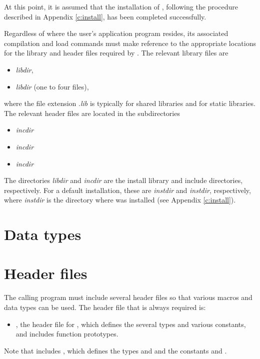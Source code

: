 At this point, it is assumed that the installation of {\ida},
following the procedure described in Appendix \ref{c:install}, has
been completed successfully.

Regardless of where the user's application program resides, its
associated compilation and load commands must make reference to the
appropriate locations for the library and header files required by
{\ida}.  The relevant library files are
\begin{itemize}
\item {\em libdir},
\item {\em libdir} (one to four files),
\end{itemize}
where the file extension .{\em lib} is typically  for shared libraries
and  for static libraries. The relevant header files are located in
the subdirectories
\begin{itemize}
\item {\em incdir}
\item {\em incdir}
\item {\em incdir}
\end{itemize}
The directories {\em libdir} and {\em incdir} are the install library
and include directories, respectively. For a default installation,
these are {\em instdir} and {\em instdir},
respectively, where {\em instdir} is the directory where {\sundials}
was installed (see Appendix \ref{c:install}).

\section{Data types}\label{s:types}


\section{Header files}\label{ss:header_sim}
The calling program must include several header files so that various macros
and data types can be used. The header file that is always required is:
\begin{itemize}
\item  {}, 
  the header file for {\ida}, which defines the several
  types and various constants, and includes function prototypes.
\end{itemize}
Note that  includes , 
which defines the types  and 
and the constants  and .

